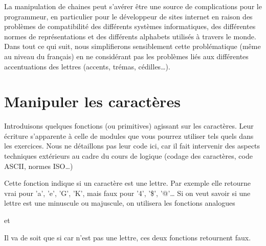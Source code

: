 	La manipulation de chaines peut s'avérer être 
	une source de complications pour le programmeur, 
	en particulier pour le développeur de sites internet 
	en raison des problèmes de compatibilité des différents systèmes informatiques, 
	des différentes normes de représentations 
	et des différents alphabets utilisés à travers le monde. 
	Dans tout ce qui suit, 
	nous simplifierons sensiblement cette problématique 
	(même au niveau du français) 
	en ne considérant pas les problèmes liés aux différentes 
	accentuations des lettres (accents, trémas, cédilles\dots). 

\section{Manipuler les caractères}

	Introduisons quelques fonctions (ou primitives) 
	agissant sur les caractères. 
	Leur écriture s'apparente à celle de modules 
	que vous pourrez utiliser tels quels dans les exercices. 
	Nous ne détaillons pas leur code ici, 
	car il fait intervenir des aspects techniques 
	extérieurs au cadre du cours de logique 
	(codage des caractères, code ASCII, normes ISO\dots)

	\begin{center}
	\end{center}

	Cette fonction indique si un caractère est une lettre. 
	Par exemple elle retourne vrai pour 'a', 'e', 'G', 'K', 
	mais faux pour '4', '\$', '@'\dots %
	Si on veut savoir si une lettre est une minuscule ou majuscule, 
	on utilisera les fonctions analogues

	\begin{center}
	\end{center}
	
	et

	\begin{center}
	\end{center}

	Il va de soit que si car n'est pas une lettre, 
	ces deux fonctions retournent faux.

	\begin{center}
	\end{center}

